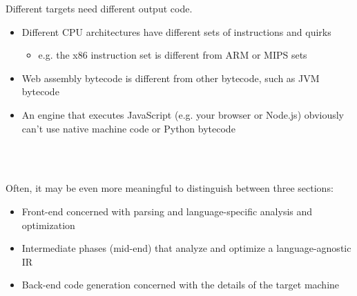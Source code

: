 \documentclass[../index.tex]{subfiles}
\begin{document}
\begin{frame}{\currenttitle}
  Different targets need different output code. 

  \begin{itemize}
    \item<2-> Different CPU architectures have different sets of instructions and quirks
      \begin{itemize}
        \item e.g. the x86 instruction set is different from ARM or MIPS sets
      \end{itemize}
    \item<3-> Web assembly bytecode is different from other bytecode, such as JVM bytecode
    \item<4-> An engine that executes JavaScript (e.g. your browser or Node.js)
      obviously can't use native machine code or Python bytecode
  \end{itemize}

  \vspace*{1em}
\end{frame}

\begin{frame}{\currenttitle}
   \\[2em]

   \\[1em]
    
  \hspace*{2em}

\end{frame}

\begin{frame}{\currenttitle}
  Often, it may be even more meaningful to distinguish between three sections:

  \only<+->{}
  \begin{itemize}
    \item<+-> Front-end concerned with parsing and language-specific analysis
      and optimization
    \item<+-> Intermediate phases (mid-end) that analyze and optimize a language-agnostic
      IR
    \item<+-> Back-end code generation concerned with the details of the target
      machine
  \end{itemize}
\end{frame}
\end{document}
